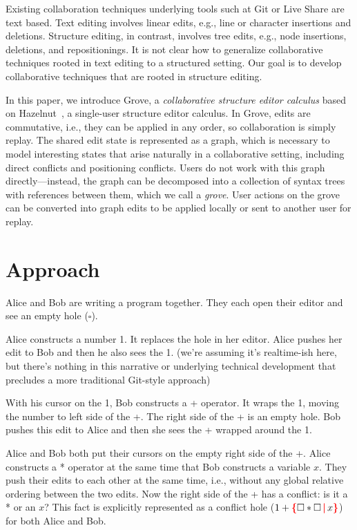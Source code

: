 \documentclass[nonacm, acmsmall, screen, review]{acmart}
\newcommand{\hole}{\ensuremath{\square}} %
\newcommand{\conflictHole}[1]{%
{\noexpandarg\StrSubstitute{#1}{,}{\textcolor{red}{\,\textbf{|}\,}}[\myargs]%
{\textcolor{red}{\textbf{\{}}\myargs\textcolor{red}{\textbf{\}}}}}}%
\begin{document}
Existing collaboration techniques underlying tools such at Git or Live Share are text based.
Text editing involves linear edits, e.g., line or character insertions and deletions.
Structure editing, in contrast, involves tree edits, e.g., node insertions, deletions, and repositionings.
It is not clear how to generalize collaborative techniques rooted in text editing to a structured setting.
Our goal is to develop collaborative techniques that are rooted in structure editing.

In this paper, we introduce Grove, a \emph{collaborative structure editor calculus} based on Hazelnut~\cite{omar_hazelnut_2017}, a single-user structure editor calculus.
In Grove, edits are commutative, i.e., they can be applied in any order, so collaboration is simply replay.
The shared edit state is represented as a graph, which is necessary to model interesting states that arise naturally in a collaborative setting, 
including direct conflicts and positioning conflicts. 
Users do not work with this graph directly---instead, the graph can be decomposed into a collection of syntax trees with references between them, which we call a \emph{grove}.
User actions on the grove can be converted into graph edits to be applied locally or sent to another user for replay.


\section{Approach}

Alice and Bob are writing a program together.
They each open their editor and see an empty hole ($\hole$).

Alice constructs a number 1.
It replaces the hole in her editor.
Alice pushes her edit to Bob and then he also sees the 1.
(we're assuming it's realtime-ish here, but there's nothing in this narrative or underlying technical development that precludes a more traditional Git-style approach)

With his cursor on the 1, Bob constructs a + operator.
It wraps the 1, moving the number to left side of the +.
The right side of the + is an empty hole.
Bob pushes this edit to Alice and then she sees the + wrapped around the 1.

Alice and Bob both put their cursors on the empty right side of the +.
Alice constructs a * operator at the same time that Bob constructs a variable $x$.
They push their edits to each other at the same time, i.e., without any global relative ordering between the two edits.
Now the right side of the + has a conflict: is it a * or an $x$?
This fact is explicitly represented as a conflict hole ($1 + \conflictHole{\hole * \hole, x}$) for both Alice and Bob.
\end{document}
